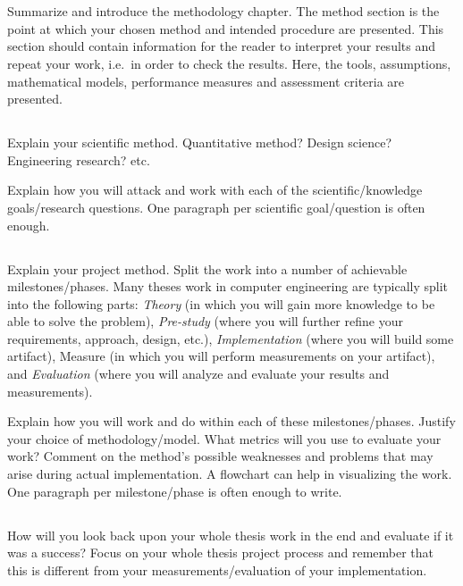 \section{}\label{sec:method}
Summarize and introduce the methodology chapter. The method section is the point
at which your chosen method and intended procedure are presented. This section
should contain information for the reader to interpret your results and repeat
your work, i.e.\ in order to check the results. Here, the tools, assumptions,
mathematical models, performance measures and assessment criteria are presented.

\subsection{}\label{subsec:scientificmethod}
Explain your scientific method. Quantitative method? Design science? Engineering research? etc. 

Explain how you will attack and work with each of the scientific/knowledge
goals/research questions. One paragraph per scientific goal/question is often
enough.

\subsection{}\label{subsec:projectmethod}

Explain your project method. Split the work into a number of achievable milestones/phases. Many
theses work in computer engineering are typically split into the following parts: 
\emph{Theory} (in which you will gain more knowledge to be able to solve the problem),
\emph{Pre-study} (where you will further refine your requirements, approach, design, etc.),
\emph{Implementation} (where you will build some artifact), Measure (in which you will perform
measurements on your artifact), and \emph{Evaluation} (where you will analyze and evaluate your
results and measurements).  

Explain how you will work and do within each of these milestones/phases. Justify
your choice of methodology/model. What metrics will you use to evaluate your work? Comment on the
method's possible weaknesses and problems that may arise during actual implementation. A flowchart
can help in visualizing the work. One paragraph per milestone/phase is often enough to write.

\subsection{}\label{subsec:evalmethod}
How will you look back upon your whole thesis work in the end and evaluate if it
was a success? Focus on your whole thesis project process and remember that this
is different from your measurements/evaluation of your implementation.
